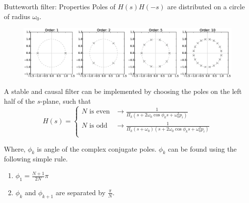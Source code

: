 \documentclass{beamer}
\begin{document}
\begin{frame}{Butteworth filter: Properties}
Poles of $H(s)H(-s)$ are distributed on a circle of radius $\omega_0$.
\vspace{-5mm}
\begin{figure}
\centering
\includegraphics[width=1.\textwidth]{img/butter_poles.eps}
\end{figure}
\vspace{-5mm}
\begin{small}
A stable and causal filter can be implemented by choosing the poles on the left half of the $s$-plane, such that
\[ H(s) = \begin{cases}
N \text{ is even} & \longrightarrow \frac{1}{\Pi_{k}(s +2\omega_0\cos \phi_k s + \omega_0^2 p_i)} \\
N \text{ is odd} & \longrightarrow \frac{1}{\Pi_{k}(s+\omega_0)(s +2\omega_0\cos \phi_k s + \omega_0^2 p_i)} \\
\end{cases} \]

Where, $\phi_k$ is angle of the complex conjugate poles. $\phi_k$ can be found using the following simple rule.
\begin{enumerate}
\item $\phi_1 = \frac{N+1}{2N}\pi$
\item $\phi_k$ and $\phi_{k+1}$ are separated by $\frac{\pi}{N}$.
\end{enumerate}
\end{small}
\end{frame}
\end{document}
